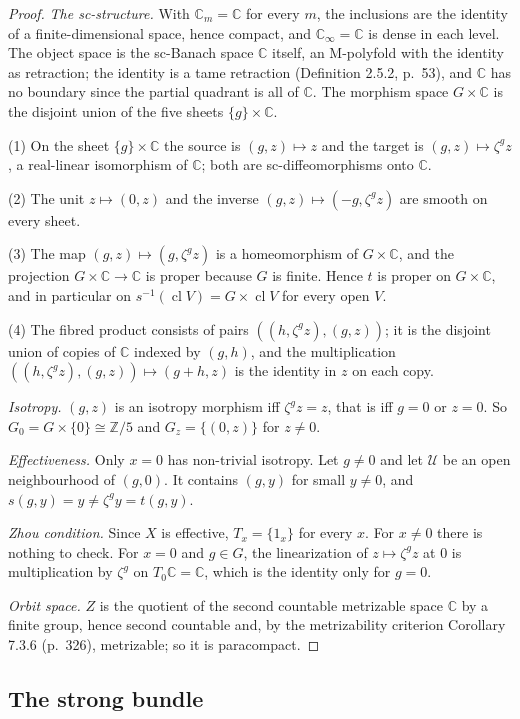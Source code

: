 \documentclass[11pt,a4paper]{article}
\theoremstyle{plain}
\theoremstyle{definition}
\theoremstyle{remark}
\newcommand{\C}{\mathbb{C}}
\newcommand{\Z}{\mathbb{Z}}
\newcommand{\ZZ}{\Z/5}
\newcommand{\cl}{\operatorname{cl}}
\begin{document}
\begin{proof}
\emph{The sc-structure.} With $\C_m=\C$ for every $m$, the inclusions are the identity of a
finite-dimensional space, hence compact, and $\C_\infty=\C$ is dense in each level. The object space is
the sc-Banach space $\C$ itself, an M-polyfold with the identity as retraction; the identity is a tame
retraction (Definition 2.5.2, p.~53), and $\C$ has no boundary since the partial quadrant is all of $\C$.
The morphism space $G\times\C$ is the disjoint union of the five sheets $\{g\}\times\C$.

(1) On the sheet $\{g\}\times\C$ the source is $(g,z)\mapsto z$ and the target is
$(g,z)\mapsto\zeta^g z$, a real-linear isomorphism of $\C$; both are sc-diffeomorphisms onto $\C$.

(2) The unit $z\mapsto(0,z)$ and the inverse $(g,z)\mapsto(-g,\zeta^g z)$ are smooth on every sheet.

(3) The map $(g,z)\mapsto(g,\zeta^g z)$ is a homeomorphism of $G\times\C$, and the projection
$G\times\C\to\C$ is proper because $G$ is finite. Hence $t$ is proper on $G\times\C$, and in particular
on $s^{-1}(\cl V)=G\times\cl V$ for every open $V$.

(4) The fibred product consists of pairs $((h,\zeta^g z),(g,z))$; it is the disjoint union of copies of
$\C$ indexed by $(g,h)$, and the multiplication $((h,\zeta^g z),(g,z))\mapsto(g+h,z)$ is the identity in
$z$ on each copy.

\emph{Isotropy.} $(g,z)$ is an isotropy morphism iff $\zeta^g z=z$, that is iff $g=0$ or $z=0$. So
$G_0=G\times\{0\}\cong\ZZ$ and $G_z=\{(0,z)\}$ for $z\neq0$.

\emph{Effectiveness.} Only $x=0$ has non-trivial isotropy. Let $g\neq0$ and let $\mathcal U$ be an open
neighbourhood of $(g,0)$. It contains $(g,y)$ for small $y\neq0$, and $s(g,y)=y\neq\zeta^g y=t(g,y)$.

\emph{Zhou condition.} Since $X$ is effective, $T_x=\{1_x\}$ for every $x$. For $x\neq0$ there is
nothing to check. For $x=0$ and $g\in G$, the linearization of $z\mapsto\zeta^g z$ at $0$ is
multiplication by $\zeta^g$ on $T_0\C=\C$, which is the identity only for $g=0$.

\emph{Orbit space.} $Z$ is the quotient of the second countable metrizable space $\C$ by a finite group,
hence second countable and, by the metrizability criterion Corollary 7.3.6 (p.~326), metrizable; so it
is paracompact.
\end{proof}

\subsection{The strong bundle}
\end{document}
